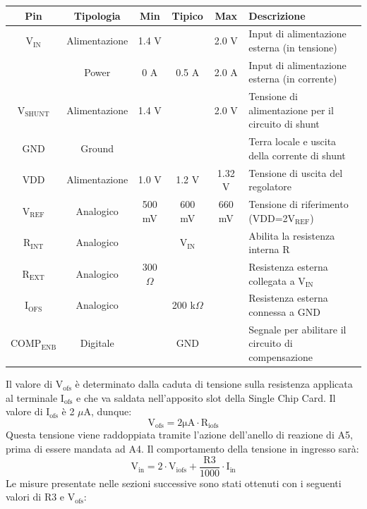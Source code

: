 \begin{small}
\noindent\setlength\tabcolsep{4pt}%
\begin{tabularx}{\linewidth}{|c|c|c|c|c|X|}
\hline
\textbf{Pin} & \textbf{Tipologia} & \textbf{Min} & \textbf{Tipico} & \textbf{Max} & \textbf{Descrizione} \\ \hline

$\mathrm{V_{IN}}$ & Alimentazione & 1.4 V & & 2.0 V & Input di alimentazione esterna (in tensione)\\ \hline
 & Power & 0 A & 0.5 A & 2.0 A & Input di alimentazione esterna (in corrente)\\ \hline     
$\mathrm{V_{SHUNT}}$ & Alimentazione & 1.4 V & & 2.0 V & Tensione di alimentazione per il circuito di shunt\\ \hline
GND & Ground &  & &  & Terra locale e uscita della corrente di shunt\\ \hline
VDD & Alimentazione & 1.0 V & 1.2 V & 1.32 V & Tensione di uscita del regolatore\\ \hline
$\mathrm{V_{REF}}$ & Analogico & 500 mV & 600 mV & 660 mV & Tensione di riferimento (VDD=2$\mathrm{V_{REF}}$)\\ \hline
$\mathrm{R_{INT}}$ & Analogico &  & $\mathrm{V_{IN}}$ &  & Abilita la resistenza interna R\\ \hline
$\mathrm{R_{EXT}}$ & Analogico & 300 $\Omega$ &  &  & Resistenza esterna collegata a $\mathrm{V_{IN}}$\\ \hline
$\mathrm{I_{OFS}}$ & Analogico &  & 200 k$\Omega$ &  & Resistenza esterna connessa a GND\\ \hline
$\mathrm{COMP_{ENB}}$ & Digitale &  & GND &  & Segnale per abilitare il circuito di compensazione\\ \hline
\end{tabularx}
\end{small}

Il valore di $\mathrm{V_{ofs}}$ è determinato dalla caduta di tensione sulla resistenza applicata al terminale $\mathrm{I_{ofs}}$ e che va saldata nell'apposito slot della Single Chip Card.
Il valore di $\mathrm{I_{ofs}}$ è 2 $\mu$A, dunque:
\begin{equation}
\label{eq:Vofs}
\mathrm{V_{ofs} = 2 \mu A \cdot R_{iofs}}
\end{equation}
Questa tensione viene raddoppiata tramite l'azione dell'anello di reazione di A5, prima di essere mandata ad A4.
Il comportamento della tensione in ingresso sarà:
\begin{equation}
\mathrm{V_{in}= 2 \cdot V_{iofs} + \dfrac{R3}{1000} \cdot I_{in}}
\end{equation}
Le misure presentate nelle sezioni successive sono stati ottenuti con i seguenti valori di R3 e $\mathrm{V_{ofs}}$:

